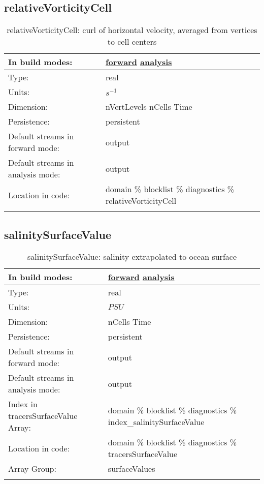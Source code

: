 \subsection[relativeVorticityCell]{relativeVorticityCell}
\label{subsec:var_sec_diagnostics_relativeVorticityCell}
\begin{center}
\begin{longtable}{| p{2.0in} | p{4.0in} |}
        \hline 
        In build modes: & \hyperref[subsec:forward_var_tab_diagnostics]{forward} \hyperref[subsec:analysis_var_tab_diagnostics]{analysis} \\
        \hline 
        Type: & real \\
        \hline 
        Units: & $s^{-1}$ \\
        \hline 
        Dimension: & nVertLevels nCells Time \\
        \hline 
        Persistence: & persistent \\
        \hline 
		 Default streams in forward mode: &  output \\
        \hline 
		 Default streams in analysis mode: &  output \\
        \hline 
		 Location in code: & domain \% blocklist \% diagnostics \% relativeVorticityCell \\
		 \hline 
    \caption{relativeVorticityCell: curl of horizontal velocity, averaged from vertices to cell centers}
\end{longtable}
\end{center}
\subsection[salinitySurfaceValue]{salinitySurfaceValue}
\label{subsec:var_sec_diagnostics_salinitySurfaceValue}
\begin{center}
\begin{longtable}{| p{2.0in} | p{4.0in} |}
        \hline 
        In build modes: & \hyperref[subsec:forward_var_tab_diagnostics]{forward} \hyperref[subsec:analysis_var_tab_diagnostics]{analysis} \\
        \hline 
        Type: & real \\
        \hline 
        Units: & $PSU$ \\
        \hline 
        Dimension: & nCells Time \\
        \hline 
        Persistence: & persistent \\
        \hline 
		 Default streams in forward mode: &  output \\
        \hline 
		 Default streams in analysis mode: &  output \\
        \hline 
		 Index in tracersSurfaceValue Array: & domain \% blocklist \% diagnostics \% index\_salinitySurfaceValue \\
		 \hline 
		 Location in code: & domain \% blocklist \% diagnostics \% tracersSurfaceValue \\
		 \hline 
		 Array Group: & surfaceValues \\
		 \hline 
    \caption{salinitySurfaceValue: salinity extrapolated to ocean surface}
\end{longtable}
\end{center}
